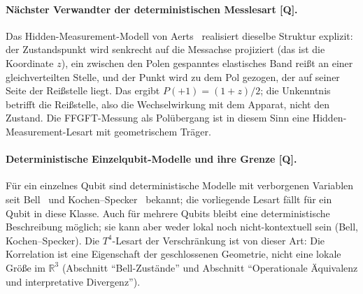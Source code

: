 \paragraph{Nächster Verwandter der deterministischen Messlesart [Q].}
Das Hidden-Measurement-Modell von Aerts~\cite{aerts1986,aerts2014}
realisiert dieselbe Struktur explizit: der Zustandspunkt wird
senkrecht auf die Messachse projiziert (das ist die Koordinate $z$),
ein zwischen den Polen gespanntes elastisches Band reißt an einer
gleichverteilten Stelle, und der Punkt wird zu dem Pol gezogen, der
auf seiner Seite der Reißstelle liegt. Das ergibt $P(+1) = (1+z)/2$;
die Unkenntnis betrifft die Reißstelle, also die Wechselwirkung mit
dem Apparat, nicht den Zustand. Die
FFGFT-Messung als Polübergang ist in diesem Sinn eine
Hidden-Measurement-Lesart mit geometrischem Träger.

\paragraph{Deterministische Einzelqubit-Modelle und ihre Grenze [Q].}
Für ein einzelnes Qubit sind deterministische Modelle mit verborgenen
Variablen seit Bell~\cite{bell1966} und
Kochen--Specker~\cite{kochen1967} bekannt; die vorliegende Lesart fällt
für ein Qubit in diese Klasse. Auch für mehrere Qubits bleibt eine
deterministische Beschreibung möglich; sie kann aber weder lokal noch
nicht-kontextuell sein (Bell, Kochen--Specker). Die $T^4$-Lesart der
Verschränkung ist von dieser Art: Die Korrelation ist eine
Eigenschaft der geschlossenen Geometrie, nicht eine lokale Größe im
$\mathbb{R}^3$ (Abschnitt \enquote{Bell-Zustände} und Abschnitt
\enquote{Operationale Äquivalenz und interpretative Divergenz}).

